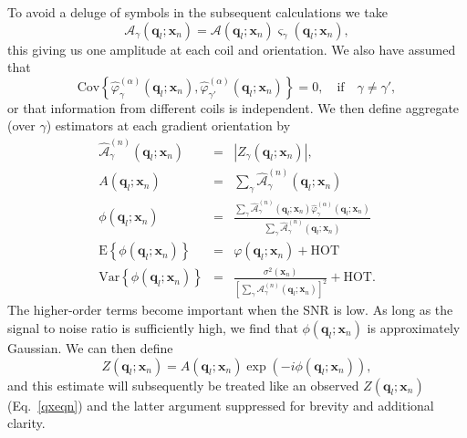 \documentclass[authoryear,preprint,12pt]{elsarticle}
\newcommand{\var}{\text{Var}}
\newcommand{\cov}{\text{Cov}}
\newcommand{\HOT}{\text{HOT}}
\newcommand{\E}{\text{E}}
\newcommand{\q}{\mathbf{q}}
\newcommand{\x}{\mathbf{x}}
\newcommand{\cA}{\mathcal{A}}
\newcommand{\wh}[1]{\widehat{#1}}
\begin{document}
To avoid a deluge of symbols in the subsequent calculations we take
\begin{equation}
  \cA_{\gamma}(\q_l;\x_n) = \cA(\q_l;\x_n) \varsigma_{\gamma}(\q_l;\x_n),
\end{equation}
this giving us one amplitude at each coil and orientation.  
We also have assumed that
\begin{equation}
  \cov\left\{\hat{\varphi}_{\gamma}^{(\alpha)}(\q_l;\x_n),
  \hat{\varphi}_{\gamma'}^{(\alpha)}(\q_l;\x_n)\right\} = 0, \quad
  \text{if} \quad \gamma \neq \gamma',
\end{equation}
or that information from different coils is independent.  We then
define aggregate (over $\gamma$) estimators at each gradient
orientation by
\begin{eqnarray}\label{aggregate}
  \wh{\cA}_{\gamma}^{(n)}(\q_l;\x_n) &=&
  \left|Z_{\gamma}(\q_l;\x_n)\right|,\\
  A(\q_l;\x_n) &=& \sum_{\gamma}\wh{\cA}_{\gamma}^{(n)}(\q_l;\x_n)\\
  \phi(\q_l;\x_n) &=& \frac{\sum_{\gamma} \wh{\cA}_{\gamma}^{(n)}(\q_l;\x_n)\hat{\varphi}_{\gamma}^{(\alpha)}(\q_l;\x_n)}{\sum_{\gamma} \wh{\cA}_{\gamma}^{(n)}(\q_l;\x_n)}\\ 
  \nonumber
  \E\left\{\phi(\q_l;\x_n)\right\} &=& \varphi(\q_l;\x_n) + \HOT\\
  \nonumber
  \var\left\{\phi(\q_l;\x_n) \right\} &= &
  \frac{\sigma^2(\x_n)}{\left[\sum_{\gamma}{\cA}_{\gamma}^{(n)}(\q_l;\x_n)\right]^2} + \HOT.  
\end{eqnarray}
The higher-order terms become important when the SNR is low.  As long
as the signal to noise ratio is sufficiently high, we find that
$\phi(\q_l;\x_n)$ is approximately Gaussian.  We can then
define
\begin{equation}
  Z(\q_l;\x_n) = A(\q_l;\x_n)\exp\left(-i\phi(\q_l;\x_n)\right),
\end{equation}
and this estimate will subsequently be treated like an observed
$Z(\q_l;\x_n)$ (Eq.~\eqref{qxeqn}) and the latter argument suppressed
for brevity and additional clarity.



\end{document}
